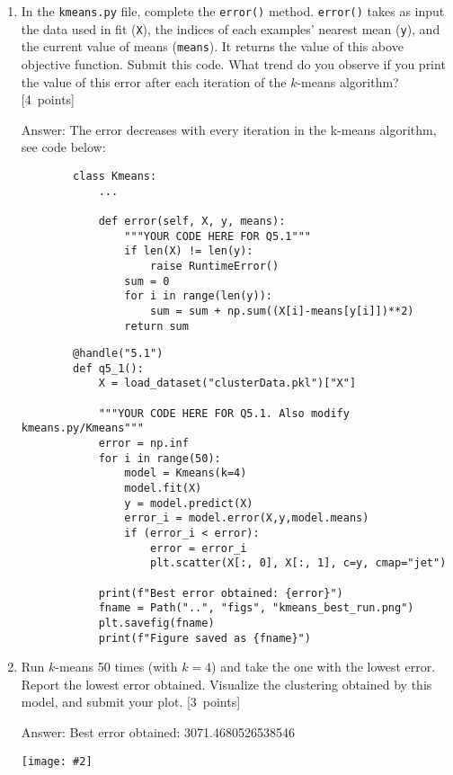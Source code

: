 \documentclass{article}
\newcommand{\blu}[1]{{\textcolor{blu}{#1}}}
\newcommand{\gre}[1]{\textcolor{gre}{#1}}
\newcommand\ans[1]{\par\gre{Answer: #1}}
\let\ask\blu
\newcommand\pts[1]{\textcolor{pointscolour}{[#1~points]}}
\newcommand{\centerfig}[2]{\begin{center}\texttt{[image: \#2]}\end{center}}
\begin{document}
    \begin{enumerate}
        \item In the \texttt{kmeans.py} file, complete the \texttt{error()} method. \texttt{error()} takes as input the data used in fit (\texttt{X}), the indices of each examples' nearest mean (\texttt{y}), and the current value of means (\texttt{means}). It returns the value of this above objective function. \ask{Submit this code. What trend do you observe if you print the value of this error after each iteration of the $k$-means algorithm?} \pts{4}
        \ans{The error decreases with every iteration in the k-means algorithm, see code below:}
        \begin{verbatim}
        class Kmeans:
            ...
        
            def error(self, X, y, means):
                """YOUR CODE HERE FOR Q5.1"""
                if len(X) != len(y):
                    raise RuntimeError()
                sum = 0
                for i in range(len(y)):
                    sum = sum + np.sum((X[i]-means[y[i]])**2)
                return sum
        \end{verbatim}
        \begin{verbatim}
        @handle("5.1")
        def q5_1():
            X = load_dataset("clusterData.pkl")["X"]
        
            """YOUR CODE HERE FOR Q5.1. Also modify kmeans.py/Kmeans"""
            error = np.inf
            for i in range(50):
                model = Kmeans(k=4)
                model.fit(X)
                y = model.predict(X)
                error_i = model.error(X,y,model.means)
                if (error_i < error):
                    error = error_i
                    plt.scatter(X[:, 0], X[:, 1], c=y, cmap="jet")
        
            print(f"Best error obtained: {error}")
            fname = Path("..", "figs", "kmeans_best_run.png")
            plt.savefig(fname)
            print(f"Figure saved as {fname}")
        \end{verbatim}
        \newpage
        
        \item Run $k$-means 50 times (with $k=4$) and take the one with the lowest error. \ask{Report the lowest error obtained.} Visualize the clustering obtained by this model, and \ask{submit your plot}. \pts{3}
        \ans{Best error obtained: 3071.4680526538546}
        \centerfig{.7}{figs/kmeans_best_run.png}
    \end{enumerate}
\end{document}
